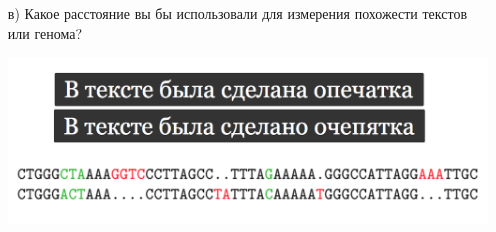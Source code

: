 \documentclass[12pt, a4paper, oneside]{article}
\begin{document}
\begin{enumerate}
\item[в)] Какое расстояние вы бы использовали для измерения похожести текстов или генома?

\begin{center}
	\includegraphics[scale=0.3]{metr_3.png}
\end{center}

\end{enumerate}
\end{document}
